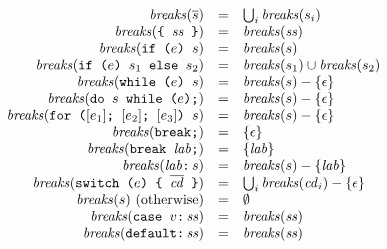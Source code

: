 \documentclass{article}
\newcommand{\seq}[1]{\overline{{#1}}}
\newcommand{\mathjs}[1]{\mbox{\texttt{{#1}}}}
\newcommand{\while}[2]{\mathjs{while (}{#1}\mathjs{) }{#2}}
\newcommand{\dowhile}[2]{\mathjs{do }{#1}\mathjs{ while (}{#2}\mathjs{);}}
\newcommand{\for}[4]{\mathjs{for (}{#1}\mathjs{; }{#2}\mathjs{; }{#3}\mathjs{) }{#4}}
\newcommand{\switch}[2]{\mathjs{switch (}{#1}\mathjs{) \char123{} }{#2}\mathjs{ \char125{}}}
\newcommand{\brk}{\mathjs{break;}}
\newcommand{\brkl}[1]{\mathjs{break }{#1}\mathjs{;}}
\newcommand{\lab}[2]{{#1}\mathjs{:}\,{#2}}
\newcommand{\ifthen}[2]{\mathjs{if (}{#1}\mathjs{) }{#2}}
\newcommand{\ifthenelse}[3]{\mathjs{if (}{#1}\mathjs{) }{#2}\mathjs{ else }{#3}}
\newcommand{\block}[1]{\mathjs{\char123{} }{#1}\mathjs{ \char125{}}}
\newcommand{\breaks}{\mathit{breaks}}
\begin{document}
\[
\begin{array}{rcl}
\breaks(\seq{s}) & = & \bigcup_i \breaks(s_i) \\
\breaks(\block{\mathit{ss}}) & = & \breaks(\mathit{ss}) \\
\breaks(\ifthen{e}{s}) & = & \breaks(s) \\
\breaks(\ifthenelse{e}{s_1}{s_2}) & = & \breaks(s_1) \cup \breaks(s_2) \\
\breaks(\while{e}{s}) & = & \breaks(s) - \{ \epsilon \} \\
\breaks(\dowhile{s}{e}) & = & \breaks(s) - \{ \epsilon \} \\
\breaks(\for{[e_1]}{[e_2]}{[e_3]}{s}) & = & \breaks(s) - \{ \epsilon \} \\
\breaks(\brk) & = & \{ \epsilon \} \\
\breaks(\brkl{\mathit{lab}}) & = & \{ \mathit{lab} \} \\
\breaks(\lab{\mathit{lab}}{s}) & = & \breaks(s) - \{ \mathit{lab} \} \\
\breaks(\switch{e}{\seq{\mathit{cd}}}) & = & \bigcup_i \breaks(\mathit{cd}_i) - \{ \epsilon \} \\
\breaks(s) \mbox{ (otherwise)} & = & \emptyset \\
\breaks(\mathjs{case }v\mathjs{:}\,\mathit{ss}) & = & \breaks(\mathit{ss}) \\
\breaks(\mathjs{default:}\,\mathit{ss}) & = & \breaks(\mathit{ss}) \\
\end{array}
\]
\end{document}
